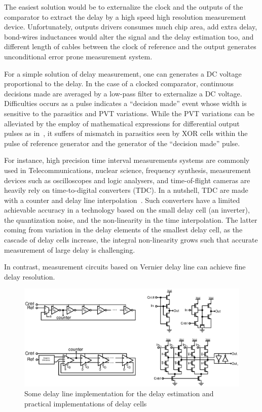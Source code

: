 The easiest solution would be to externalize the clock and the outputs of the comparator to extract the delay by a high speed high resolution measurement device. Unfortunately, outputs drivers consumes much chip area, add extra delay, bond-wires inductances would alter the signal and the delay estimation too, and different length of cables between the clock of reference and the output generates unconditional error prone measurement system.

For a simple solution of delay measurement, one can generates a DC voltage proportional to the delay. In the case of a clocked comparator, continuous decisions made are averaged by a low-pass filter to externalize a DC voltage. Difficulties occurs as a pulse indicates a ``decision made'' event whose width is sensitive to the parasitics and PVT variations. While the PVT variations can be alleviated by the employ of mathematical expressions for differential output pulses as in~\cite{1706643}, it suffers of mismatch in parasitics seen by XOR cells within the pulse of reference generator and the generator of the ``decision made'' pulse.


For instance, high precision time interval measurements systems are commonly used in Telecommunications, nuclear science, frequency synthesis, measurement devices such as oscilloscopes and logic analysers, and time-of-flight cameras are heavily rely on time-to-digital converters (TDC). In a nutshell, TDC are made with a counter and delay line interpolation~\cite{1637593}. Such converters have a limited achievable accuracy in a technology based on the small delay cell (an inverter), the quantization noise, and the non-linearity in the time interpolation. The latter coming from variation in the delay elements of the smallest delay cell, as the cascade of delay cells increase, the integral non-linearity grows such that accurate measurement of large delay is challenging.

In contrast, measurement circuits based on Vernier delay line can achieve fine delay resolution.

\begin{figure}[htp]
    \centering
    \includegraphics[width=\textwidth]{Chapter5/Figs/delay_line_implementation_possible.ps}
    \caption{Some delay line implementation for the delay estimation and practical implementations of delay cells}
    \label{fig:delay_vernier_interpolation}
\end{figure}

